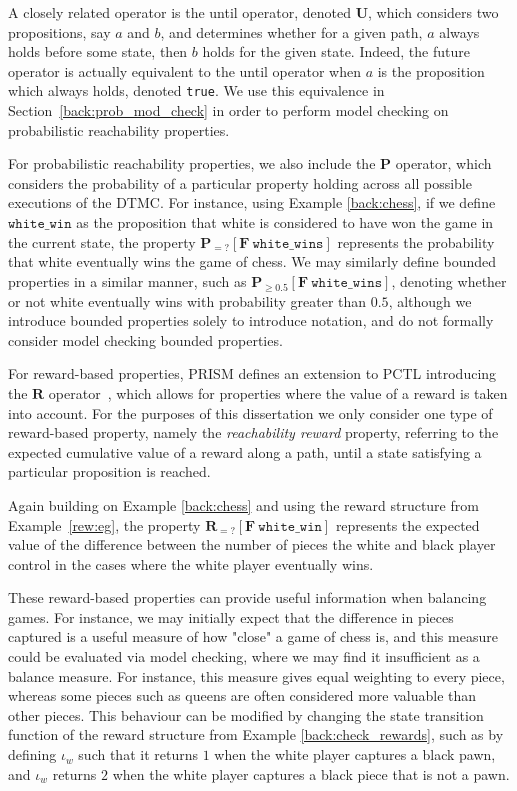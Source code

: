 A closely related operator is the until operator, denoted  $\mathbf{U}$, which considers two propositions, say $a$ and $b$, and determines whether for a given path, $a$ always holds before some state, then $b$ holds for the given state. Indeed, the future operator is actually equivalent to the until operator when $a$ is the proposition which always holds, denoted \verb+true+. We use this equivalence in Section~\ref{back:prob_mod_check} in order to perform model checking on probabilistic reachability properties.

For probabilistic reachability properties, we also include the $\mathbf{P}$ operator, which considers the probability of a particular property holding across all possible executions of the DTMC. For instance, using Example \ref{back:chess}, if we define $\mathtt{white\_win}$ as the proposition that white is considered to have won the game in the current state, the property $\mathbf{P}_{=?} [\mathbf{F}\ \mathtt{white\_wins}]$ represents the probability that white eventually wins the game of chess. We may similarly define bounded properties in a similar manner, such as $\mathbf{P}_{\geq 0.5} [\mathbf{F}\ \mathtt{white\_wins}]$, denoting whether or not white eventually wins with probability greater than $0.5$, although we introduce bounded properties solely to introduce notation, and do not formally consider model checking bounded properties.

For reward-based properties, PRISM defines an extension to PCTL introducing the $\mathbf{R}$ operator~\cite{kwiatkowska_stochastic_2007}, which allows for properties where the value of a reward is taken into account. For the purposes of this dissertation we only consider one type of reward-based property, namely the \emph{reachability reward} property, referring to the expected cumulative value of a reward along a path, until a state satisfying a particular proposition is reached.

\begin{example}
\label{back:chess_reward}
Again building on Example \ref{back:chess} and using the reward structure from Example~\ref{rew:eg}, the property $\mathbf{R}_{=?} [\mathbf{F}\ \mathtt{white\_win}]$ represents the expected value of the difference between the number of pieces the white and black player control in the cases where the white player eventually wins. 
\end{example}

These reward-based properties can provide useful information when balancing games. For instance, we may initially expect that the difference in pieces captured is a useful measure of how "close" a game of chess is, and this measure could be evaluated via model checking, where we may find it insufficient as a balance measure. For instance, this measure gives equal weighting to every piece, whereas some pieces such as queens are often considered more valuable than other pieces. This behaviour can be modified by changing the state transition function of the reward structure from Example \ref{back:check_rewards}, such as by defining $\iota_w$ such that it returns $1$ when the white player captures a black pawn, and $\iota_w$ returns $2$ when the white player captures a black piece that is not a pawn.

